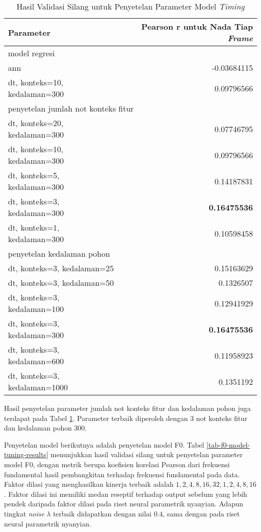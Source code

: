 \begin{table}[htbp]
    \centering
    \caption{Hasil Validasi Silang untuk Penyetelan Parameter Model \textit{Timing}}\label{tab-timing-model-tuning-results}
    \begin{tabular}{ |l|r| } 
     \hline
     Parameter & Pearson r untuk Nada Tiap \textit{Frame} \\
     \hline 
     \multicolumn{2}{|l|}{model regresi}\\ \hline
	 ann    &-0.03684115\\ \hline
	 dt, konteks=10, kedalaman=300     & 0.09796566\\ \hline
	 \multicolumn{2}{|l|}{penyetelan jumlah not konteks fitur}\\ \hline
	 dt, konteks=20, kedalaman=300       &0.07746795\\ \hline
	 dt, konteks=10, kedalaman=300      &0.09796566\\ \hline
	 dt, konteks=5, kedalaman=300     &0.14187831\\ \hline
	 dt, konteks=3, kedalaman=300     &\textbf{0.16475536}\\ \hline
	 dt, konteks=1, kedalaman=300      &0.10598458\\ \hline
	 \multicolumn{2}{|l|}{penyetelan kedalaman pohon}\\ \hline
	 dt, konteks=3, kedalaman=25 	 &0.15163629\\\hline
	 dt, konteks=3, kedalaman=50     &0.1326507\\\hline
	 dt, konteks=3, kedalaman=100      &0.12941929\\\hline
	 dt, konteks=3, kedalaman=300     &\textbf{0.16475536}\\ \hline
	 dt, konteks=3, kedalaman=600     &0.11958923\\\hline
	 dt, konteks=3, kedalaman=1000     &0.1351192   \\  \hline
    \end{tabular}
\end{table}

Hasil penyetelan parameter jumlah not konteks fitur dan kedalaman pohon juga terdapat pada Tabel \ref{tab-timing-model-tuning-results}. Parameter terbaik diperoleh dengan 3 not konteks fitur dan kedalaman pohon 300.

Penyetelan model berikutnya adalah penyetelan model F0. Tabel \ref{tab-f0-model-tuning-results} menunjukkan hasil validasi silang untuk penyetelan parameter model F0, dengan metrik berupa koefisien korelasi Pearson dari frekuensi fundamental hasil pembangkitan terhadap frekuensi fundamental pada data. Faktor dilasi yang menghasilkan kinerja terbaik adalah $1,2,4,8,16,32,1,2,4,8,16$. Faktor dilasi ini memiliki medan reseptif terhadap output sebelum yang lebih pendek daripada faktor dilasi pada riset neural parametrik nyanyian. Adapun tingkat \textit{noise} $\lambda$ terbaik didapatkan dengan nilai $0.4$, sama dengan pada riset neural parametrik nyanyian.


